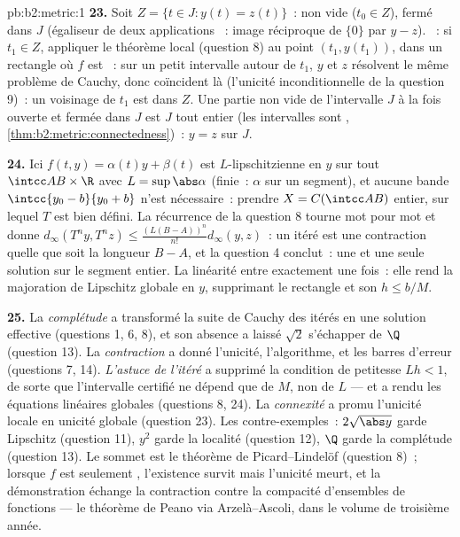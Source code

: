 \begin{solution}{pb:b2:metric:1}
\textbf{23.} Soit $Z = \{t \in J : y(t) = z(t)\}$~: non vide ($t_0
\in Z$), fermé dans $J$ (égaliseur de deux applications ~:
image réciproque de $\{0\}$ par $y - z$). ~: si $t_1 \in Z$,
appliquer le théorème local (question 8) au point $(t_1, y(t_1))$,
dans un rectangle où $f$ est ~: sur un petit intervalle
autour de $t_1$, $y$ et $z$ résolvent le même problème de Cauchy,
donc coïncident là (l'unicité inconditionnelle de la question 9)~: un
voisinage de $t_1$ est dans $Z$. Une partie non vide de l'intervalle
$J$ à la fois ouverte et fermée dans $J$ est $J$ tout entier (les
intervalles sont , \cref{thm:b2:metric:connectedness})~: $y =
z$ sur $J$.

\textbf{24.} Ici $f(t, y) = \alpha(t)y + \beta(t)$ est
$L$-lipschitzienne en $y$ sur tout $\intcc AB \times \R$ avec $L =
\sup\abs\alpha$ (finie~: $\alpha$  sur un segment), et
aucune bande $\intcc{y_0 - b}{y_0 + b}$ n'est nécessaire~: prendre $X
= C(\intcc AB)$ entier, sur lequel $T$ est bien défini. La récurrence
de la question 8 tourne mot pour mot et donne $d_\infty(T^ny, T^nz)
\leq \frac{(L(B - A))^n}{n!}d_\infty(y, z)$~: un itéré est une
contraction quelle que soit la longueur $B - A$, et la question 4
conclut~: une et une seule solution sur le segment entier. La
linéarité entre exactement une fois~: elle rend la majoration de
Lipschitz globale en $y$, supprimant le rectangle et son $h \leq
b/M$.

\textbf{25.} La \emph{complétude} a transformé la suite de Cauchy des
itérés en une solution effective (questions 1, 6, 8), et son absence
a laissé $\sqrt2$ s'échapper de $\Q$ (question 13). La
\emph{contraction} a donné l'unicité, l'algorithme, et les barres
d'erreur (questions 7, 14). \emph{L'astuce de l'itéré} a supprimé la
condition de petitesse $Lh < 1$, de sorte que l'intervalle certifié
ne dépend que de $M$, non de $L$ --- et a rendu les équations
linéaires globales (questions 8, 24). La \emph{connexité} a promu
l'unicité locale en unicité globale (question 23). Les
contre-exemples~: $2\sqrt{\abs y}$ garde Lipschitz (question 11),
$y^2$ garde la localité (question 12), $\Q$ garde la complétude
(question 13). Le sommet est le théorème de Picard--Lindelöf
(question 8)~; lorsque $f$ est seulement , l'existence
survit mais l'unicité meurt, et la démonstration échange la
contraction contre la compacité d'ensembles de fonctions --- le
théorème de Peano via Arzelà--Ascoli, dans le volume de troisième
année.
\end{solution}
